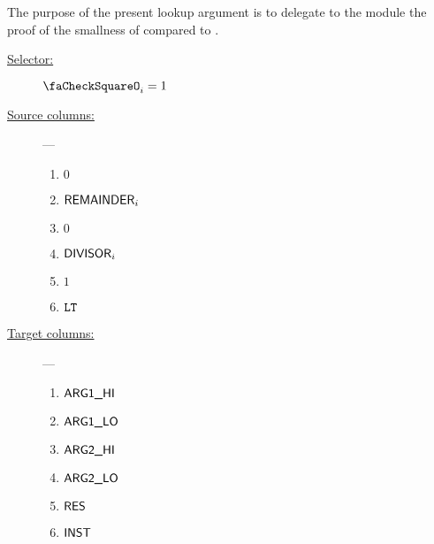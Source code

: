 The purpose of the present lookup argument is to delegate to the \wcpMod{} module the proof of the smallness of \remainder{} compared to \divisor{}.
\begin{description}
	\item[\underline{Selector:}] $\done_{i}=1$
	\item[\underline{Source columns:}] ---
		\begin{multicols}{3}
			\begin{enumerate}
				\item $0$
				\item $\textsf{REMAINDER}_{i}$
				\item $0$
				\item $\textsf{DIVISOR}_{i}$
				\item $1$
				\item $\texttt{LT}$
			\end{enumerate}
		\end{multicols}
	\item[\underline{Target columns:}] ---
		\begin{multicols}{3}
		\begin{enumerate}
			\item $\textsf{ARG}\textsf{1}\textsf{\_HI}$
			\item $\textsf{ARG}\textsf{1}\textsf{\_LO}$
			\item $\textsf{ARG}\textsf{2}\textsf{\_HI}$
			\item $\textsf{ARG}\textsf{2}\textsf{\_LO}$
			\item $\textsf{RES}$
			\item $\textsf{INST}$
		\end{enumerate}
		\end{multicols}
\end{description}

